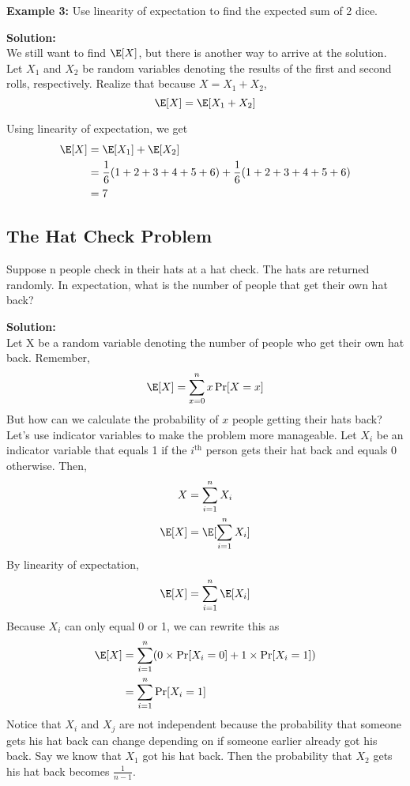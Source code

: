 \vspace{5mm}

\textbf{Example 3:}
Use linearity of expectation to find the expected sum of 2 dice.

\vspace{2.5mm}

\textbf{Solution:} \\
We still want to find $\E[X]$, but there is another way to arrive at the solution. Let $X_{1}$ and $X_{2}$ be random variables denoting the results of the first and second rolls, respectively. Realize that because $X = X_{1} + X_{2}$,
    $$
    \E[X] = \E[X_{1} + X_{2}]
    $$
    
Using linearity of expectation, we get
    \begin{align*}
        \E[X] &= \E[X_{1}] + \E[X_{2}] \\
        &= \frac{1}{6}(1 + 2 + 3 + 4 + 5 + 6) + \frac{1}{6} (1 + 2 + 3 + 4 + 5 + 6) \\
        &= 7
    \end{align*}

\pagebreak
    
\subsection*{The Hat Check Problem}
Suppose n people check in their hats at a hat check. The hats are returned randomly. In expectation, what is the number of people that get their own hat back?

\vspace{2.5mm}

\textbf{Solution:} \\
Let X be a random variable denoting the number of people who get their own hat back. Remember,
    $$
    \E[X] = \sum_{x=0}^{n}x\Pr[X = x]
    $$
But how can we calculate the probability of $x$ people getting their hats back? Let’s use indicator variables to make the problem more manageable. Let $X_{i}$ be an indicator variable that equals 1 if the $i^{\text{th}}$ person gets their hat back and equals 0 otherwise. Then,
    \begin{align*}
        X &= \sum_{i=1}^{n}X_{i} \\
        \E[X] &= \E[\sum_{i=1}^{n}X_{i}]
    \end{align*}
By linearity of expectation,
    $$
    \E[X] = \sum_{i=1}^{n}\E[X_{i}]
    $$
Because $X_{i}$ can only equal 0 or 1, we can rewrite this as
    \begin{align*}
        \E[X] &= \sum_{i=1}^{n}(0 \times \Pr[X_{i} = 0] + 1 \times \Pr[X_{i} = 1]) \\
        &= \sum_{i=1}^{n}\Pr[X_{i} = 1]
    \end{align*}
Notice that $X_{i}$ and $X_{j}$ are not independent because the probability that someone gets his hat back can change depending on if someone earlier already got his back. Say we know that $X_{1}$ got his hat back. Then the probability that $X_{2}$ gets his hat back becomes $\frac{1}{n-1}$.

